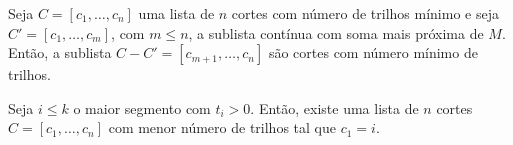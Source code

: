 \begin{theorem}
    Seja $C = [c_1, \ldots, c_n]$ uma lista de $n$ cortes com número de trilhos mínimo e seja $C' = [c_1, \ldots, c_m]$, com $m \leq n$, a sublista contínua com soma mais próxima de $M$. Então, a sublista $C - C' = [c_{m + 1}, \ldots, c_n]$ são cortes com número mínimo de trilhos.
\end{theorem}

\begin{theorem}
    Seja $i \leq k$ o maior segmento com $t_i > 0$. Então, existe uma lista de $n$ cortes $C = [c_1, \ldots, c_n]$ com menor número de trilhos tal que $c_1 = i$.
\end{theorem}
